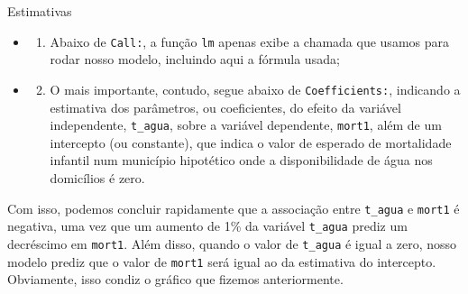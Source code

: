 \documentclass[
  9pt,
  ignorenonframetext,
  aspectratio=169]{beamer}
\providecommand{\tightlist}{%
  \setlength{\itemsep}{0pt}\setlength{\parskip}{0pt}}
\begin{document}
\begin{frame}[fragile]{Estimativas}
\begin{itemize}
\item
  \begin{enumerate}
  \tightlist
  \item
    Abaixo de \texttt{Call:}, a função \texttt{lm} apenas exibe a
    chamada que usamos para rodar nosso modelo, incluindo aqui a fórmula
    usada;
  \end{enumerate}
\item
  \begin{enumerate}
  \setcounter{enumi}{1}
  \tightlist
  \item
    O mais importante, contudo, segue abaixo de \texttt{Coefficients:},
    indicando a estimativa dos parâmetros, ou coeficientes, do efeito da
    variável independente, \texttt{t\_agua}, sobre a variável
    dependente, \texttt{mort1}, além de um intercepto (ou constante),
    que indica o valor de esperado de mortalidade infantil num município
    hipotético onde a disponibilidade de água nos domicílios é zero.
  \end{enumerate}
\end{itemize}

Com isso, podemos concluir rapidamente que a associação entre
\texttt{t\_agua} e \texttt{mort1} é negativa, uma vez que um aumento de
1\% da variável \texttt{t\_agua} prediz um decréscimo em \texttt{mort1}.
Além disso, quando o valor de \texttt{t\_agua} é igual a zero, nosso
modelo prediz que o valor de \texttt{mort1} será igual ao da estimativa
do intercepto. Obviamente, isso condiz o gráfico que fizemos
anteriormente.
\end{frame}
\end{document}
